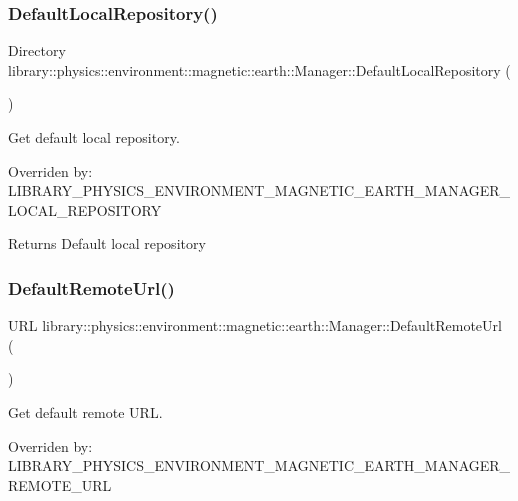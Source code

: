 \subsubsection{\texorpdfstring{Default\+Local\+Repository()}{DefaultLocalRepository()}}
{\footnotesize\ttfamily Directory library\+::physics\+::environment\+::magnetic\+::earth\+::\+Manager\+::\+Default\+Local\+Repository (\begin{DoxyParamCaption}{ }\end{DoxyParamCaption})\hspace{0.3cm}{\ttfamily [static]}}



Get default local repository. 

Overriden by\+: L\+I\+B\+R\+A\+R\+Y\+\_\+\+P\+H\+Y\+S\+I\+C\+S\+\_\+\+E\+N\+V\+I\+R\+O\+N\+M\+E\+N\+T\+\_\+\+M\+A\+G\+N\+E\+T\+I\+C\+\_\+\+E\+A\+R\+T\+H\+\_\+\+M\+A\+N\+A\+G\+E\+R\+\_\+\+L\+O\+C\+A\+L\+\_\+\+R\+E\+P\+O\+S\+I\+T\+O\+RY

\begin{DoxyReturn}{Returns}
Default local repository 
\end{DoxyReturn}
\mbox{\label{classlibrary_1_1physics_1_1environment_1_1magnetic_1_1earth_1_1_manager_af27590c795dd6b87166b84495b777d2f}} 
\subsubsection{\texorpdfstring{Default\+Remote\+Url()}{DefaultRemoteUrl()}}
{\footnotesize\ttfamily U\+RL library\+::physics\+::environment\+::magnetic\+::earth\+::\+Manager\+::\+Default\+Remote\+Url (\begin{DoxyParamCaption}{ }\end{DoxyParamCaption})\hspace{0.3cm}{\ttfamily [static]}}



Get default remote U\+RL. 

Overriden by\+: L\+I\+B\+R\+A\+R\+Y\+\_\+\+P\+H\+Y\+S\+I\+C\+S\+\_\+\+E\+N\+V\+I\+R\+O\+N\+M\+E\+N\+T\+\_\+\+M\+A\+G\+N\+E\+T\+I\+C\+\_\+\+E\+A\+R\+T\+H\+\_\+\+M\+A\+N\+A\+G\+E\+R\+\_\+\+R\+E\+M\+O\+T\+E\+\_\+\+U\+RL


